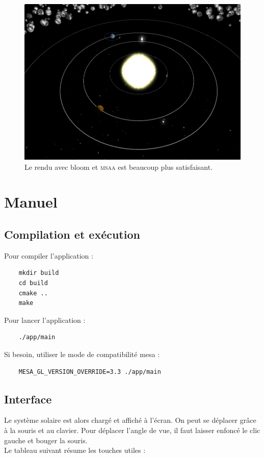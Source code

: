\documentclass[11pt,a4paper]{article}
\begin{document}
\begin{figure}[h!]
\centering
\includegraphics[width=0.60\columnwidth]{img/b.png}
\caption{Le rendu avec bloom et \textsc{msaa} est beaucoup plus satisfaisant.}
\end{figure}

\newpage
\section{Manuel}

\subsection{Compilation et exécution}

Pour compiler l'application :
\begin{lstlisting}
	mkdir build
	cd build
	cmake ..
	make
\end{lstlisting}
Pour lancer l'application :
\begin{lstlisting}
	./app/main
\end{lstlisting}
Si besoin, utiliser le mode de compatibilité mesa :
\begin{lstlisting}
	MESA_GL_VERSION_OVERRIDE=3.3 ./app/main
\end{lstlisting}

\subsection{Interface}

Le système solaire est alors chargé et affiché à l'écran. On peut se déplacer grâce à la souris et au clavier. Pour déplacer
l'angle de vue, il faut laisser enfoncé le clic gauche et bouger la souris.\\
Le tableau suivant résume les touches utiles :\\
\end{document}
